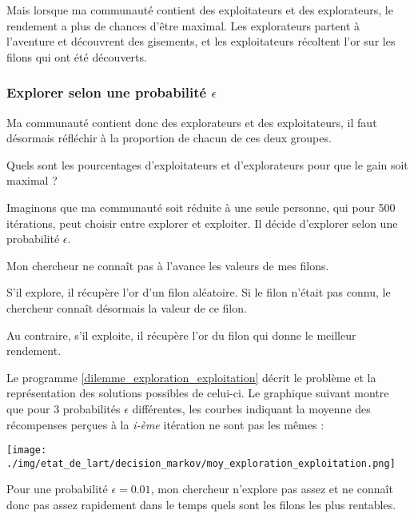 \documentclass[
12pt,
french,
]{article}
\let\origfigure\figure
\let\endorigfigure\endfigure
\renewenvironment{figure}[1][2] {
  \expandafter\origfigure\expandafter[H]
} {
  \endorigfigure
}
\begin{document}
Mais lorsque ma communauté contient des exploitateurs et des
explorateurs, le rendement a plus de chances d'être maximal. Les
explorateurs partent à l'aventure et découvrent des gisements, et les
exploitateurs récoltent l'or sur les filons qui ont été découverts.

\hypertarget{explorer-selon-une-probabilituxe9-epsilon}{%
\subsubsection{\texorpdfstring{Explorer selon une probabilité
\(\epsilon\)}{Explorer selon une probabilité \textbackslash epsilon}}\label{explorer-selon-une-probabilituxe9-epsilon}}

Ma communauté contient donc des explorateurs et des exploitateurs, il
faut désormais réfléchir à la proportion de chacun de ces deux groupes.

Quels sont les pourcentages d'exploitateurs et d'explorateurs pour que
le gain soit maximal ?

Imaginons que ma communauté soit réduite à une seule personne, qui pour
500 itérations, peut choisir entre explorer et exploiter. Il décide
d'explorer selon une probabilité \(\epsilon\).

Mon chercheur ne connaît pas à l'avance les valeurs de mes filons.

S'il explore, il récupère l'or d'un filon aléatoire. Si le filon n'était
pas connu, le chercheur connaît désormais la valeur de ce filon.

Au contraire, s'il exploite, il récupère l'or du filon qui donne le
meilleur rendement.

Le programme \ref{dilemme_exploration_exploitation} décrit le problème
et la représentation des solutions possibles de celui-ci. Le graphique
suivant montre que pour 3 probabilités \(\epsilon\) différentes, les
courbes indiquant la moyenne des récompenses perçues à la \emph{i-ème}
itération ne sont pas les mêmes :

\begin{figure}
\centering
\texttt{[image: ./img/etat\_de\_lart/decision\_markov/moy\_exploration\_exploitation.png]}
\caption{Graphique de moyennes des récompenses perçues en fonction d'une
probabilité Epsilon}
\end{figure}

Pour une probabilité \(\epsilon = 0.01\), mon chercheur n'explore pas
assez et ne connaît donc pas assez rapidement dans le temps quels sont
les filons les plus rentables.
\end{document}
